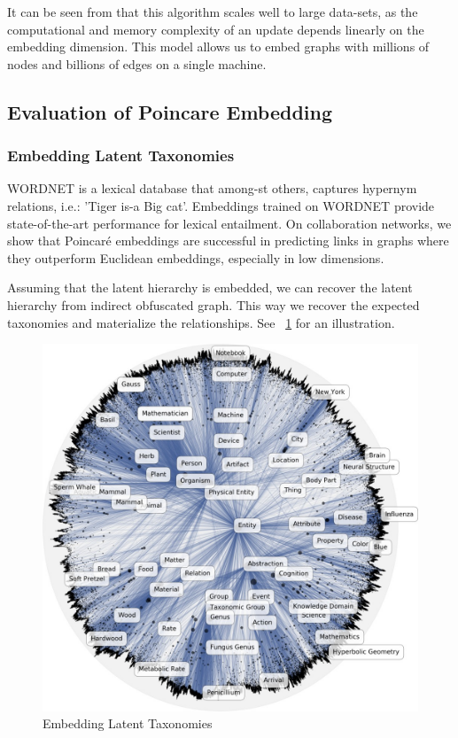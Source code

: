 It can be seen from that this algorithm scales well to large data-sets, as the computational and memory complexity of an update depends linearly on the embedding dimension. This model allows us to embed graphs with millions of nodes and billions of edges on a single machine.

\subsection{Evaluation of Poincare Embedding}
\subsubsection{Embedding Latent Taxonomies}

WORDNET is a lexical database that among-st others, captures hypernym relations, i.e.: 'Tiger is-a Big cat'. Embeddings trained on WORDNET provide state-of-the-art performance for lexical entailment. On collaboration networks, we show that Poincaré embeddings are successful in predicting links in graphs where they outperform Euclidean embeddings, especially in low dimensions.  

Assuming that the latent hierarchy is embedded, we can recover the latent hierarchy from indirect obfuscated graph. This way we recover the expected taxonomies and materialize the relationships. See ~\ref{fig:wn-nouns} for an illustration.
\begin{figure}[htb]
  \centering
    \includegraphics[width=\textwidth]{figs/wn-nouns2.jpg}
    \caption{Embedding Latent Taxonomies}
    \label{fig:wn-nouns}
\end{figure}

